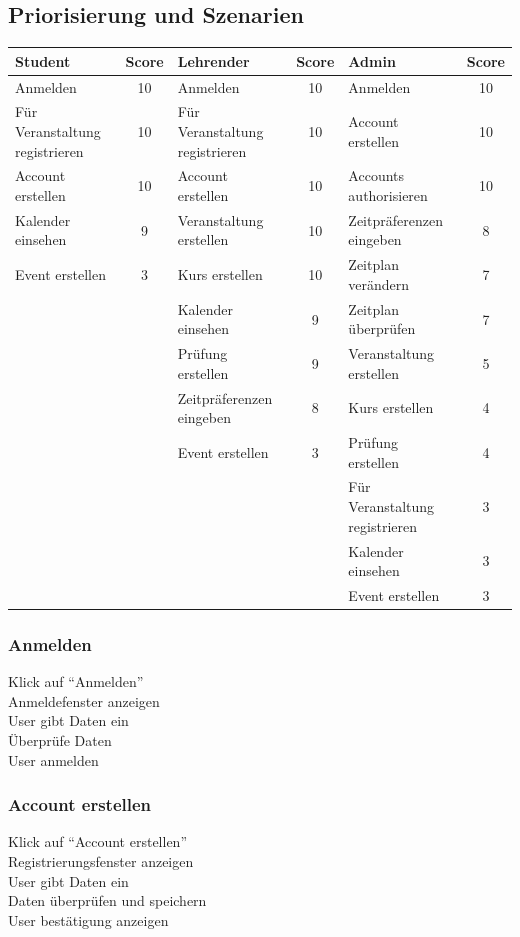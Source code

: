 \documentclass[a4paper,12pt]{article}
\begin{document}
	\subsection*{Priorisierung und Szenarien}
	\begin{tabular}{|p{3cm}|c|p{3cm}|c|p{3cm}|c|}
		\hline
		\textbf{Student} & \textbf{Score} & \textbf{Lehrender} & \textbf{Score} & \textbf{Admin} & \textbf{Score} \\ \hline
		Anmelden & 10 & Anmelden & 10 & Anmelden & 10 \\ \hline
		Für Veranstaltung registrieren & 10 & Für Veranstaltung registrieren & 10 & Account erstellen & 10 \\ \hline
		Account erstellen & 10 & Account erstellen & 10 & Accounts authorisieren & 10 \\ \hline
		Kalender einsehen & 9 & Veranstaltung erstellen & 10 & Zeitpräferenzen eingeben & 8 \\ \hline
		Event erstellen & 3 & Kurs erstellen & 10 & Zeitplan verändern & 7 \\ \hline
		&& Kalender einsehen & 9 & Zeitplan überprüfen & 7 \\ \hline
		&& Prüfung erstellen & 9 & Veranstaltung erstellen & 5 \\ \hline
		&& Zeitpräferenzen eingeben & 8 & Kurs erstellen & 4 \\ \hline
		&& Event erstellen & 3 & Prüfung erstellen & 4 \\ \hline
		&&&& Für Veranstaltung registrieren & 3 \\ \hline
		&&&& Kalender einsehen & 3 \\ \hline
		&&&& Event erstellen & 3 \\ \hline
	\end{tabular}
	\newpage
	\subsubsection*{Anmelden}
		Klick auf “Anmelden” \\
		Anmeldefenster anzeigen \\
		User gibt Daten ein \\
		Überprüfe Daten \\
		User anmelden
	\subsubsection*{Account erstellen}
		Klick auf “Account erstellen” \\
		Registrierungsfenster anzeigen \\
		User gibt Daten ein\\
		Daten überprüfen und speichern\\
		User bestätigung anzeigen
\end{document}

